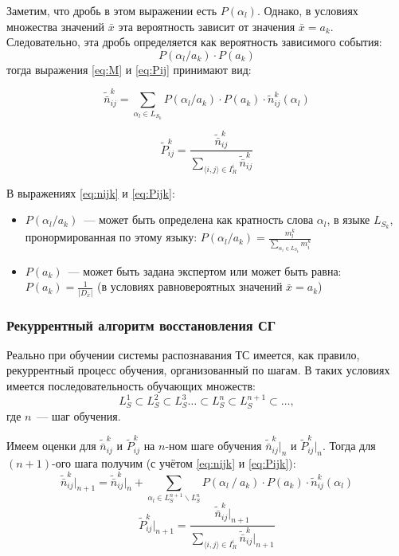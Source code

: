 Заметим, что дробь в этом выражении есть $P(\alpha_l)$. Однако, в
условиях множества значений $\bar{x}$ эта вероятность зависит от
значения $\bar{x} = a_k$. Следовательно, эта дробь определяется как
вероятность зависимого события:
$$P(\alpha_l / a_k)\cdot P(a_k)$$
тогда выражения \eqref{eq:M} и \eqref{eq:Pij} принимают вид:

\begin{equation}
  \tilde{\bar{n}}_{ij}^k = \sum_{\alpha_l \in L_{S_k}} P(\alpha_l /
  a_k) \cdot P(a_k) \cdot \tilde{n}_{ij}^k (\alpha_l)
\label{eq:nijk}
\end{equation}

\begin{equation}
  \tilde{P}_{ij}^k =
  \frac{\tilde{\bar{n}}_{ij}^k}{\sum\limits_{\langle i,j\rangle \in
      I_R^i} \tilde{\bar{n}}_{ij}^k}
\label{eq:Pijk}
\end{equation}

В выражениях \eqref{eq:nijk} и \eqref{eq:Pijk}:
\begin{itemize}
\item $P(\alpha_l / a_k)$~--- может быть определена как кратность
  слова $\alpha_l$, в языке $L_{S_k}$, пронормированная по этому
  языку: $P(\alpha_l / a_k) = \frac{m_l^k}{\sum\limits_{\alpha_i \in
      L_{S_k}} m_i^k}$
\item $P(a_k)$~--- может быть задана экспертом или может быть равна:
  $P(a_k) = \frac{1}{|D_{\bar{x}}|}$ (в условиях равновероятных
  значений $\bar{x} = a_k$)
\end{itemize}


\subsubsection{Рекуррентный алгоритм восстановления СГ}
\label{sec:recurrent_recovery_algorithm}

Реально при обучении системы распознавания ТС имеется, как правило,
рекуррентный процесс обучения, организованный по шагам. В таких
условиях имеется последовательность обучающих множеств:
\begin{equation*}
  L_S^1 \subset L_S^2 \subset L_S^3 \ldots \subset L_S^n \subset
  L_S^{n+1} \subset \ldots,
\end{equation*}
где $n$~--- шаг обучения.

Имеем оценки для $\tilde{\bar{n}}_{ij}^k$ и $\tilde{P}_{ij}^k$ на
$n$-ном шаге обучения $\tilde{\bar{n}}_{ij}^k \Bigr|_n$ и
$ \tilde{P}_{ij}^k \Bigr|_n$. Тогда для $(n+1)$-ого шага получим (с
учётом \eqref{eq:nijk} и \eqref{eq:Pijk}):
\begin{equation*}
  \tilde{\bar{n}}_{ij}^k \Bigr|_{n+1} = \tilde{\bar{n}}_{ij}^k
  \Bigr|_n + \sum_{\alpha_l \in L_S^{n+1} \mathop{\backslash} L_S^n}
  P(\alpha_l \mathop{/} a_k) \cdot P(a_k) \cdot \tilde{n}_{ij}^k
  (\alpha_l)
\end{equation*}
\begin{equation*}
   \tilde{P}_{ij}^k \Bigr|_{n+1} = \frac{\tilde{\bar{n}}_{ij}^k
     \Bigr|_{n+1}}{\sum_{\langle i,j \rangle \in I_R^i}
     \tilde{\bar{n}}_{ij}^k \Bigr|_{n+1}}
\end{equation*}

